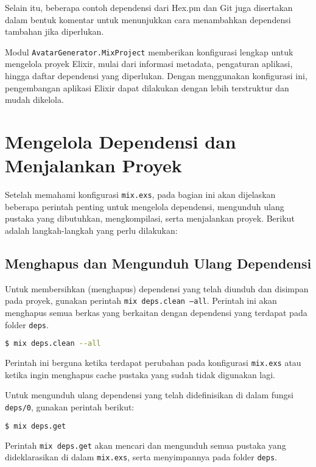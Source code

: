 Selain itu, beberapa contoh dependensi dari Hex.pm dan Git juga disertakan dalam bentuk komentar untuk menunjukkan cara menambahkan dependensi tambahan jika diperlukan.

Modul \texttt{AvatarGenerator.MixProject} memberikan konfigurasi lengkap untuk mengelola proyek Elixir, mulai dari informasi metadata, pengaturan aplikasi, hingga daftar dependensi yang diperlukan. Dengan menggunakan konfigurasi ini, pengembangan aplikasi Elixir dapat dilakukan dengan lebih terstruktur dan mudah dikelola.


\section{Mengelola Dependensi dan Menjalankan Proyek}

Setelah memahami konfigurasi \texttt{mix.exs}, pada bagian ini akan dijelaskan beberapa perintah penting untuk mengelola dependensi, mengunduh ulang pustaka yang dibutuhkan, mengkompilasi, serta menjalankan proyek. Berikut adalah langkah-langkah yang perlu dilakukan:

\subsection{Menghapus dan Mengunduh Ulang Dependensi}

Untuk membersihkan (menghapus) dependensi yang telah diunduh dan disimpan pada proyek, gunakan perintah \texttt{mix deps.clean --all}. Perintah ini akan menghapus semua berkas yang berkaitan dengan dependensi yang terdapat pada folder \texttt{deps}.

\begin{lstlisting}[language=bash]
	$ mix deps.clean --all
\end{lstlisting}

Perintah ini berguna ketika terdapat perubahan pada konfigurasi \texttt{mix.exs} atau ketika ingin menghapus cache pustaka yang sudah tidak digunakan lagi.

Untuk mengunduh ulang dependensi yang telah didefinisikan di dalam fungsi \texttt{deps/0}, gunakan perintah berikut:

\begin{lstlisting}[language=bash]
	$ mix deps.get
\end{lstlisting}

Perintah \texttt{mix deps.get} akan mencari dan mengunduh semua pustaka yang dideklarasikan di dalam \texttt{mix.exs}, serta menyimpannya pada folder \texttt{deps}.

